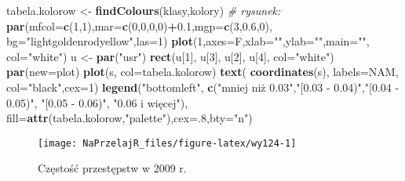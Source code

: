 \documentclass[polish,]{book}
\newenvironment{Shaded}{\begin{snugshade}}{\end{snugshade}}
\newcommand{\CommentTok}[1]{\textcolor[rgb]{0.56,0.35,0.01}{\textit{#1}}}
\newcommand{\DataTypeTok}[1]{\textcolor[rgb]{0.13,0.29,0.53}{#1}}
\newcommand{\DecValTok}[1]{\textcolor[rgb]{0.00,0.00,0.81}{#1}}
\newcommand{\FloatTok}[1]{\textcolor[rgb]{0.00,0.00,0.81}{#1}}
\newcommand{\KeywordTok}[1]{\textcolor[rgb]{0.13,0.29,0.53}{\textbf{#1}}}
\newcommand{\NormalTok}[1]{#1}
\newcommand{\OperatorTok}[1]{\textcolor[rgb]{0.81,0.36,0.00}{\textbf{#1}}}
\newcommand{\StringTok}[1]{\textcolor[rgb]{0.31,0.60,0.02}{#1}}
\begin{document}
\begin{Shaded}
\begin{Highlighting}[]
\NormalTok{tabela.kolorow <-}\StringTok{ }\KeywordTok{findColours}\NormalTok{(klasy,kolory)}
\CommentTok{# rysunek:}
\KeywordTok{par}\NormalTok{(}\DataTypeTok{mfcol=}\KeywordTok{c}\NormalTok{(}\DecValTok{1}\NormalTok{,}\DecValTok{1}\NormalTok{),}\DataTypeTok{mar=}\KeywordTok{c}\NormalTok{(}\DecValTok{0}\NormalTok{,}\DecValTok{0}\NormalTok{,}\DecValTok{0}\NormalTok{,}\DecValTok{0}\NormalTok{)}\OperatorTok{+}\FloatTok{0.1}\NormalTok{,}\DataTypeTok{mgp=}\KeywordTok{c}\NormalTok{(}\DecValTok{3}\NormalTok{,}\FloatTok{0.6}\NormalTok{,}\DecValTok{0}\NormalTok{),}
    \DataTypeTok{bg=}\StringTok{"lightgoldenrodyellow"}\NormalTok{,}\DataTypeTok{las=}\DecValTok{1}\NormalTok{)}
\KeywordTok{plot}\NormalTok{(}\DecValTok{1}\NormalTok{,}\DataTypeTok{axes=}\NormalTok{F,}\DataTypeTok{xlab=}\StringTok{""}\NormalTok{,}\DataTypeTok{ylab=}\StringTok{""}\NormalTok{,}\DataTypeTok{main=}\StringTok{""}\NormalTok{, }\DataTypeTok{col=}\StringTok{"white"}\NormalTok{)}
\NormalTok{u <-}\StringTok{ }\KeywordTok{par}\NormalTok{(}\StringTok{"usr"}\NormalTok{)}
\KeywordTok{rect}\NormalTok{(u[}\DecValTok{1}\NormalTok{], u[}\DecValTok{3}\NormalTok{], u[}\DecValTok{2}\NormalTok{], u[}\DecValTok{4}\NormalTok{], }\DataTypeTok{col=}\StringTok{"white"}\NormalTok{)}
\KeywordTok{par}\NormalTok{(}\DataTypeTok{new=}\NormalTok{plot)}
\KeywordTok{plot}\NormalTok{(s, }\DataTypeTok{col=}\NormalTok{tabela.kolorow)}
\KeywordTok{text}\NormalTok{( }\KeywordTok{coordinates}\NormalTok{(s), }\DataTypeTok{labels=}\NormalTok{NAM, }\DataTypeTok{col=}\StringTok{"black"}\NormalTok{,}\DataTypeTok{cex=}\DecValTok{1}\NormalTok{)}
\KeywordTok{legend}\NormalTok{(}\StringTok{"bottomleft"}\NormalTok{,}
       \KeywordTok{c}\NormalTok{(}\StringTok{"mniej niż 0.03"}\NormalTok{,}\StringTok{"[0.03 - 0.04)"}\NormalTok{,}\StringTok{"[0.04 - 0.05)"}\NormalTok{, }\StringTok{"[0.05 - 0.06)"}\NormalTok{, }\StringTok{"0.06 i więcej"}\NormalTok{),}
       \DataTypeTok{fill=}\KeywordTok{attr}\NormalTok{(tabela.kolorow,}\StringTok{"palette"}\NormalTok{),}\DataTypeTok{cex=}\NormalTok{.}\DecValTok{8}\NormalTok{,}\DataTypeTok{bty=}\StringTok{"n"}\NormalTok{)}
\end{Highlighting}
\end{Shaded}

\begin{figure}[h]

{\centering \texttt{[image: NaPrzelajR\_files/figure-latex/wy124-1]} 

}

\caption{Częstość przestępstw w 2009 r.}\label{fig:wy124}
\end{figure}
\end{document}
